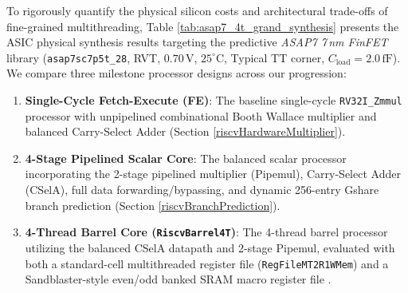 To rigorously quantify the physical silicon costs and architectural trade-offs of fine-grained multithreading, Table \ref{tab:asap7_4t_grand_synthesis} presents the ASIC physical synthesis results targeting the predictive \textit{ASAP7 7\,nm FinFET} library (\texttt{asap7sc7p5t\_28}, RVT, $0.70\,\text{V}$, $25^\circ\text{C}$, Typical TT corner, $C_{\text{load}} = 2.0\,\text{fF}$). We compare three milestone processor designs across our progression:
\begin{enumerate}
    \item \textbf{Single-Cycle Fetch-Execute (FE)}: The baseline single-cycle \texttt{RV32I\_Zmmul} processor with unpipelined combinational Booth Wallace multiplier and balanced Carry-Select Adder (Section \ref{riscvHardwareMultiplier}).
    \item \textbf{4-Stage Pipelined Scalar Core}: The balanced scalar processor incorporating the 2-stage pipelined multiplier (Pipemul), Carry-Select Adder (CSelA), full data forwarding/bypassing, and dynamic 256-entry Gshare branch prediction (Section \ref{riscvBranchPrediction}).
    \item \textbf{4-Thread Barrel Core (\texttt{RiscvBarrel4T})}: The 4-thread barrel processor utilizing the balanced CSelA datapath and 2-stage Pipemul, evaluated with both a standard-cell multithreaded register file (\texttt{RegFileMT2R1WMem}) and a Sandblaster-style even/odd banked SRAM macro register file \cite{glossner2003sandblaster}.
\end{enumerate}

